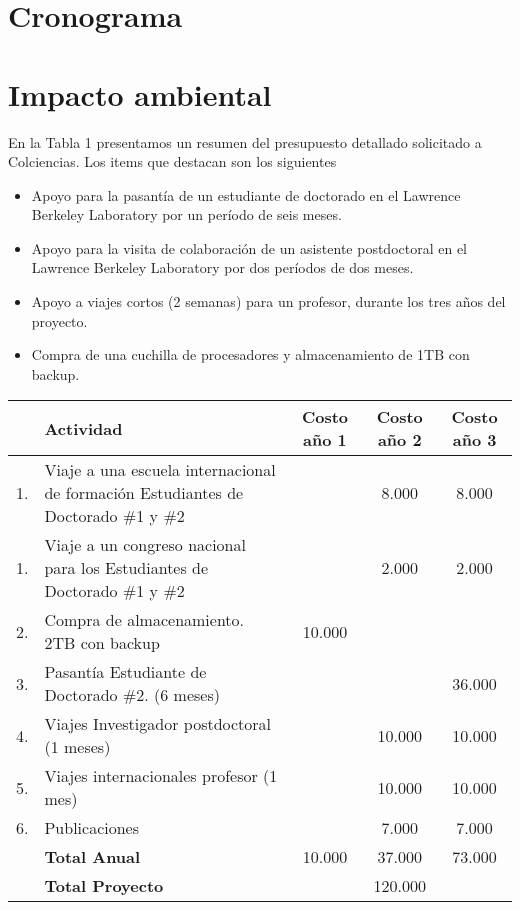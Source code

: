 \documentclass[spanish,notitlepage,letterpaper,11pt]{article} %
\begin{document}
\section{Cronograma}

\section{Impacto ambiental}


En la Tabla 1 presentamos un resumen del presupuesto detallado
solicitado a Colciencias. Los items que destacan son los siguientes

\begin{itemize}

\item Apoyo para la pasant\'ia de un estudiante de doctorado en el
  Lawrence Berkeley Laboratory por un per\'iodo de seis meses.
\item Apoyo para la visita de colaboraci\'on de un asistente postdoctoral en el
  Lawrence Berkeley Laboratory por dos per\'iodos de dos meses.
\item Apoyo a viajes cortos (2 semanas) para un profesor, durante los
  tres a\~nos del proyecto. 
\item Compra de una cuchilla de procesadores y almacenamiento de 1TB
  con backup.
\end{itemize}

\begin{tabular}{|l |p{4.5cm}| c |c |c|}\hline
 & Actividad & Costo a\~no 1 & Costo a\~no 2 & Costo a\~no 3\\\hline
1. & Viaje a una escuela internacional de formaci\'on Estudiantes de
Doctorado \#1 y \#2 & & 8.000 & 8.000\\\hline
1. & Viaje a un congreso nacional para los Estudiantes de
Doctorado \#1 y \#2 & & 2.000 & 2.000 \\\hline
2. & Compra de almacenamiento. 2TB con backup & 10.000 & & \\\hline
3. & Pasant\'ia Estudiante de Doctorado \#2. (6 meses)& &  & 36.000\\\hline
4. & Viajes Investigador postdoctoral (1 meses)& & 10.000 & 10.000\\\hline
5. & Viajes internacionales profesor (1 mes) & & 10.000 & 10.000 \\ \hline
6. & Publicaciones &  & 7.000 & 7.000\\\hline 
& {\bf Total Anual} & 10.000 & 37.000 & 73.000\\\hline
& {{\bf Total Proyecto}} & \multicolumn{3}{|c|}{120.000}\\\hline
\end{tabular}
\end{document}
